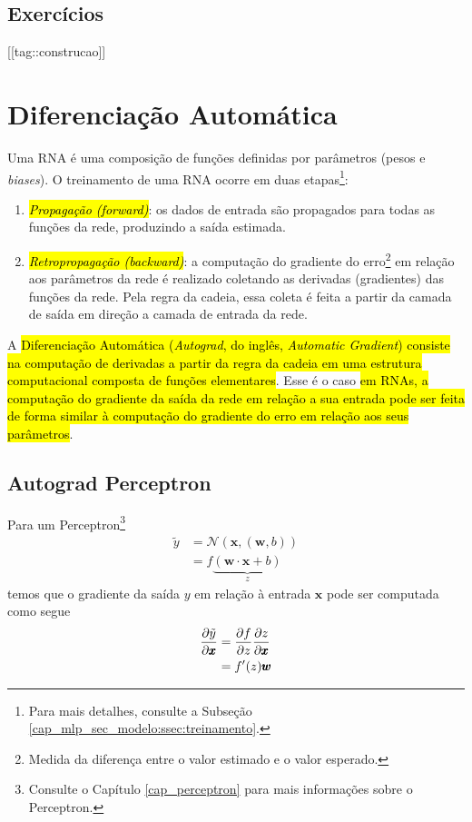 \subsection{Exercícios}

[[tag::construcao]]

\section{Diferenciação Automática}\label{cap_mlp_sec_autograd}

Uma RNA é uma composição de funções definidas por parâmetros (pesos e \textit{biases}). O treinamento de uma RNA ocorre em duas etapas\footnote{Para mais detalhes, consulte a Subseção \ref{cap_mlp_sec_modelo:ssec:treinamento}.}:
\begin{enumerate}[1.]
\item \hl{\emph{Propagação (\textit{forward})}}: os dados de entrada são propagados para todas as funções da rede, produzindo a saída estimada.
\item \hl{\emph{Retropropagação (\textit{backward})}}: a computação do gradiente do erro\footnote{Medida da diferença entre o valor estimado e o valor esperado.} em relação aos parâmetros da rede é realizado coletando as derivadas (gradientes) das funções da rede. Pela regra da cadeia, essa coleta é feita a partir da camada de saída em direção a camada de entrada da rede.
\end{enumerate}

A \hl{Diferenciação Automática (\emph{Autograd}, do inglês, \textit{Automatic Gradient}) consiste na computação de derivadas a partir da regra da cadeia em uma estrutura computacional composta de funções elementares}. Esse é o caso \hl{em RNAs, a computação do gradiente da saída da rede em relação a sua entrada pode ser feita de forma similar à computação do gradiente do erro em relação aos seus parâmetros}.

\subsection{Autograd Perceptron}

Para um Perceptron\footnote{Consulte o Capítulo \ref{cap_perceptron} para mais informações sobre o Perceptron.}
\begin{subequations}
  \begin{align}
    \tilde{y} &= \mathcal{N}\left(\pmb{x}, (\pmb{w}, b)\right)\\
              &= f\underbrace{(\pmb{w}\cdot\pmb{x} + b)}_{z}
  \end{align}
\end{subequations}
temos que o gradiente da saída $y$ em relação à entrada $\pmb{x}$ pode ser computada como segue
\begin{subequations}
  \begin{align}
    \frac{\partial \tilde{y}}{\partial\pmb{x}} &= \frac{\partial f}{\partial z}\frac{\partial z}{\partial\pmb{x}}\\
                                   &= f'(z)\pmb{w}
  \end{align}
\end{subequations}

